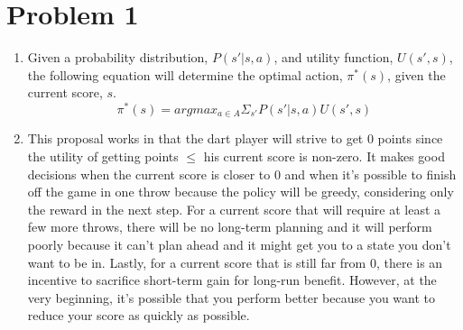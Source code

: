 \documentclass[12pt,letterpaper]{article}
\begin{document}
\thispagestyle{fancy}\small
  \section*{Problem 1}
  \begin{enumerate}[label={(\alph*) }]
        \item Given a probability distribution, $P(s'|s,a)$, and utility function, $U(s',s)$, the following equation will determine the optimal action, $\pi^*(s)$, given the current score, $s$. \medskip
        \[ \pi^*(s) = argmax_{a \in A}\Sigma_{s'} P(s'|s,a)U(s',s) \]

        
        
        \item This proposal works in that the dart player will strive to get 0 points since the utility of getting points $\leq $ his current score is non-zero.    It makes good decisions when the current score is closer to 0 and when it's possible to finish off the game in one throw because the policy will be greedy, considering only the reward in the next step. For a current score that will require at least a few more throws, there will be no long-term planning and it will perform poorly because it can't plan ahead and it might get you to a state you don't want to be in. Lastly, for a current score that is still far from 0, there is an incentive to sacrifice short-term gain for long-run benefit.
However, at the very beginning, it's possible that you perform better because you want to reduce your score as quickly as possible.   \end{enumerate}
\end{document}
